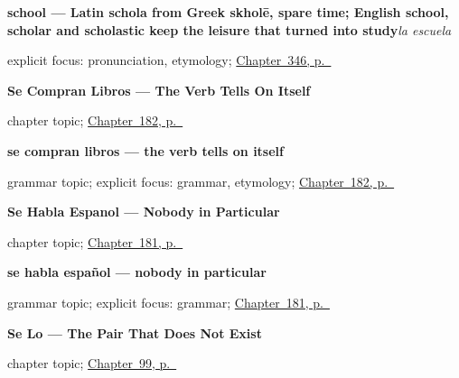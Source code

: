 \noindent\begin{minipage}[t]{\linewidth}
\raggedright
\textbf{school — Latin schola from Greek skholē, spare time; English school, scholar and scholastic keep the leisure that turned into study}\enspace\emph{la escuela}\par
\footnotesize explicit focus: pronunciation, etymology; \hyperref[ch:lugares-del-pueblo]{Chapter~346, p.~\pageref*{ch:lugares-del-pueblo}}
\end{minipage}\par\smallskip

\noindent\begin{minipage}[t]{\linewidth}
\raggedright
\textbf{Se Compran Libros --- The Verb Tells On Itself}\par
\footnotesize chapter topic; \hyperref[ch:se-agreement]{Chapter~182, p.~\pageref*{ch:se-agreement}}
\end{minipage}\par\smallskip

\noindent\begin{minipage}[t]{\linewidth}
\raggedright
\textbf{se compran libros — the verb tells on itself}\par
\footnotesize grammar topic; explicit focus: grammar, etymology; \hyperref[ch:se-agreement]{Chapter~182, p.~\pageref*{ch:se-agreement}}
\end{minipage}\par\smallskip

\noindent\begin{minipage}[t]{\linewidth}
\raggedright
\textbf{Se Habla Espanol --- Nobody in Particular}\par
\footnotesize chapter topic; \hyperref[ch:se-impersonal]{Chapter~181, p.~\pageref*{ch:se-impersonal}}
\end{minipage}\par\smallskip

\noindent\begin{minipage}[t]{\linewidth}
\raggedright
\textbf{se habla español — nobody in particular}\par
\footnotesize grammar topic; explicit focus: grammar; \hyperref[ch:se-impersonal]{Chapter~181, p.~\pageref*{ch:se-impersonal}}
\end{minipage}\par\smallskip

\noindent\begin{minipage}[t]{\linewidth}
\raggedright
\textbf{Se Lo --- The Pair That Does Not Exist}\par
\footnotesize chapter topic; \hyperref[ch:se-for-le]{Chapter~99, p.~\pageref*{ch:se-for-le}}
\end{minipage}\par\smallskip

